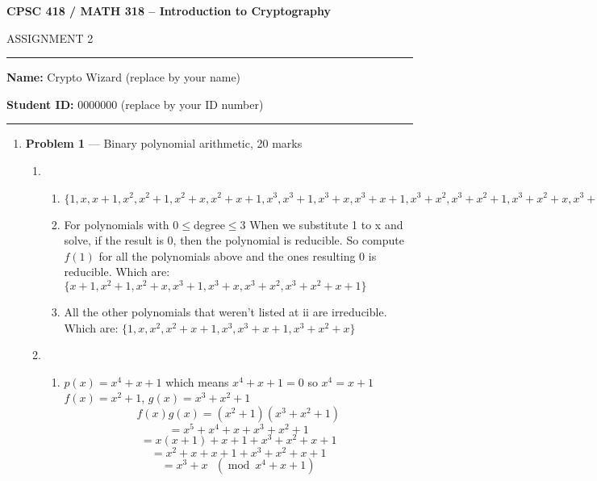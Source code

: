 \documentclass[11pt]{article}
\theoremstyle{definition}
\renewcommand{\pmod}[1]{\mbox{\ $(\ensuremath{\operatorname{mod}}\ {#1})$}}
\begin{document}
\begin{center}
{\bf \Large CPSC 418 / MATH 318 -- Introduction to Cryptography

ASSIGNMENT 2}
\end{center}

\hrule 	

\textbf{Name:} Crypto Wizard (replace by your name)

\textbf{Student ID:} 0000000 (replace by your ID number)

\medskip \hrule

\begin{enumerate}

	\item[] \textbf{Problem 1} ---  Binary polynomial arithmetic, 20 marks
	
	\begin{enumerate}
		\item %
		
		\begin{enumerate}
			\item %
			$\{1,x,x+1,x^{2},x^{2}+1,x^{2}+x,x^{2}+x+1,x^{3},x^{3}+1,x^{3}+x,x^{3}+x+1,x^{3}+x^{2},x^{3}+x^{2}+1,x^{3}+x^{2}+x,x^{3}+x^{2}+x+1 \}$
			
			\item %
			For polynomials with 0$\leq$degree$\leq$3 When we substitute 1 to x and solve, if the result is 0, then the polynomial is reducible. So compute $f(1)$ for all the polynomials above and the ones resulting 0 is reducible. Which are: \newline
			$\{x+1,x^{2}+1,x^{2}+x,x^{3}+1,x^{3}+x,x^{3}+x^{2},x^{3}+x^{2}+x+1\}$
			
			\item %
			All the other polynomials that weren't listed at ii are irreducible. Which are: \newline
			$\{1,x,x^{2},x^{2}+x+1,x^{3},x^{3}+x+1,x^{3}+x^{2}+x\}$
		
		\end{enumerate}
	
		\item %
			
		\begin{enumerate}
			\item %
			$p(x) = x^{4}+x+1$ which means $x^{4}+x+1 = 0$ so $x^4=x+1$\newline
			$f(x) = x^{2}+1$,  $g(x) = x^{3}+x^{2}+1$	\newline
			\[f(x)g(x) = (x^2+1)(x^{3}+x^{2}+1)\]
			\[= x^5 + x^4 + x + x^3 + x^2 + 1\]
			\[= x(x+1) + x+1 + x^3 + x^2 + x + 1\]
			\[= x^2 + x + x + 1 + x^3 + x^2 + x + 1\]
			\[=x^3+x \pmod{x^4+x+1} \]
			

\end{enumerate}
\end{enumerate}
\end{enumerate}
\end{document}
